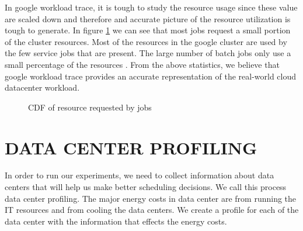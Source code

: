\documentclass[letterpaper,twocolumn,12pt]{article}
\begin{document}
In google workload trace, it is tough to study the resource usage since these value are scaled down and therefore and accurate picture of the resource utilization is tough to generate. In figure \ref{fig:resource} we can see that most jobs request a small portion of the cluster resources. Most of the resources in the google cluster are used by the few service jobs that are present. The large number of batch jobs only use a small percentage of the resources \cite{mishra2010towards} \cite{reiss2012heterogeneity}. From the above statistics, we believe that google workload trace provides an accurate representation of the real-world cloud datacenter workload.

\begin{figure} %
    \centering
    \newline
    
    \caption{CDF of resource requested by jobs}%
    \label{fig:resource}%
\end{figure}

\section{DATA CENTER PROFILING } \label{sec:datacenter}
In order to run our experiments, we need to collect information about data centers that will help us make better scheduling decisions. We call this process data center profiling. The major energy costs in data center are from running the IT resources and from cooling the data centers. We create a profile for each of the data center with the information that effects the energy costs.
\end{document}
